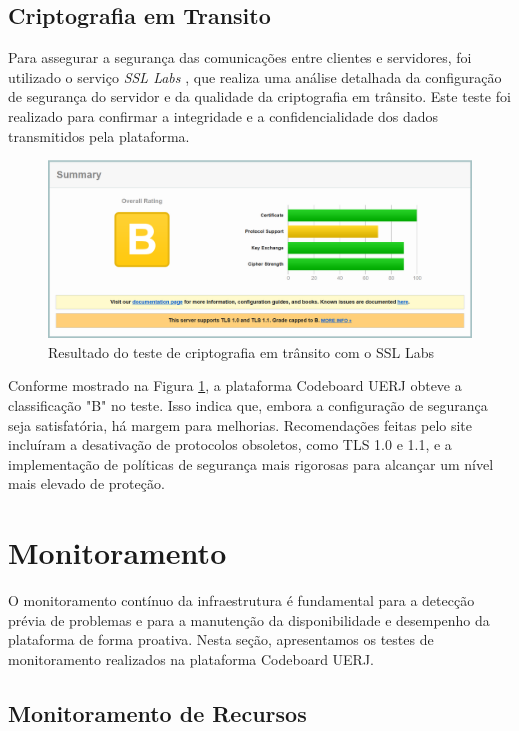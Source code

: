 \subsection{Criptografia em Transito}

Para assegurar a segurança das comunicações entre clientes e servidores, foi utilizado o serviço \emph{SSL Labs} \cite{ssl-labs}, que realiza uma análise detalhada da configuração de segurança do servidor e da qualidade da criptografia em trânsito. Este teste foi realizado para confirmar a integridade e a confidencialidade dos dados transmitidos pela plataforma.

\begin{figure}[H]
    \centering
    \includegraphics[width=1\textwidth]{assets/security-test/ssl-labs.png}
    \caption{Resultado do teste de criptografia em trânsito com o SSL Labs}
    \label{fig:ssl-labs}
\end{figure}

Conforme mostrado na Figura \ref{fig:ssl-labs}, a plataforma Codeboard UERJ obteve a classificação "B" no teste. Isso indica que, embora a configuração de segurança seja satisfatória, há margem para melhorias. Recomendações feitas pelo site incluíram a desativação de protocolos obsoletos, como TLS 1.0 e 1.1, e a implementação de políticas de segurança mais rigorosas para alcançar um nível mais elevado de proteção.


\section{Monitoramento}

O monitoramento contínuo da infraestrutura é fundamental para a detecção prévia de problemas e para a manutenção da disponibilidade e desempenho da plataforma de forma proativa. Nesta seção, apresentamos os testes de monitoramento realizados na plataforma Codeboard UERJ.

\subsection{Monitoramento de Recursos}

